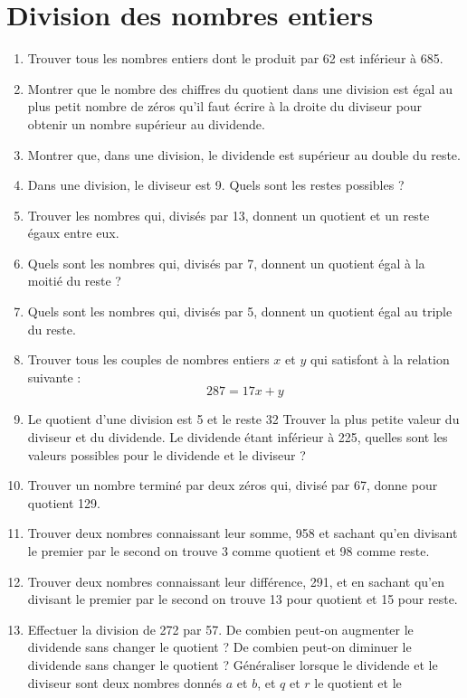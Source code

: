 
 
 \chapter{Division des nombres entiers}
 \begin{enumerate}
 \item Trouver tous les nombres entiers dont le 
 produit par 62 est inférieur à 685. 
 \item Montrer que le nombre des chiffres du quotient
 dans une division est égal au plus petit nombre de zéros qu'il 
 faut écrire à la droite du diviseur pour 
 obtenir un nombre supérieur au dividende.
 \item Montrer que, dans une division, le dividende est
 supérieur au double du reste. 
 \item Dans une division, le diviseur est 9. 
 Quels sont les restes possibles ? 
 \item Trouver les nombres qui, divisés par 13, 
 donnent un quotient et un reste égaux entre eux. 
 \item Quels sont les nombres qui, divisés par 7, 
 donnent un quotient égal à la moitié du reste ? 
 \item Quels sont les nombres qui, divisés par 5, 
 donnent un quotient égal au triple du reste. 
 \item Trouver tous les couples de nombres entiers $x$
 et $y$ qui satisfont à la relation suivante :
 \[ 287 = 17x + y\]
 \item Le quotient d'une division est 5 et le reste 32
 Trouver la plus petite valeur du diviseur et du dividende. Le dividende étant inférieur à 225, quelles 
 sont les valeurs possibles pour le dividende et le
 diviseur ? 
 \item Trouver un nombre terminé par deux zéros qui,
 divisé par 67, donne pour quotient 129. 
 \item Trouver deux nombres connaissant leur somme, 
 958 et sachant qu'en divisant le premier par le second on trouve 3 comme quotient et 98 comme reste.
 \item Trouver deux nombres connaissant leur différence, 291, et en sachant qu'en divisant le 
 premier par le second on trouve 13 pour quotient et 15 pour reste. 
 \item Effectuer la division de 272 par 57. 
 De combien peut-on augmenter le dividende sans 
 changer le quotient ? De combien peut-on diminuer le 
 dividende sans changer le quotient ? Généraliser lorsque le dividende et le diviseur sont deux nombres
 donnés $a$ et $b$, et $q$ et $r$ le quotient et le 

\end{enumerate}
